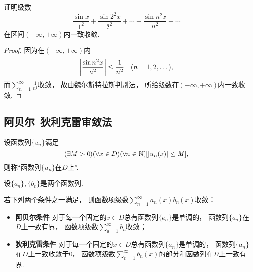 \begin{example}
证明级数\[
	\frac{\sin x}{1^2}
	+ \frac{\sin 2^2 x}{2^2}
	+ \dotsb
	+ \frac{\sin n^2 x}{n^2}
	+ \dotsb
\]在区间\((-\infty,+\infty)\)内一致收敛.
\begin{proof}
因为在\((-\infty,+\infty)\)内\[
	\abs{\frac{\sin n^2 x}{n^2}} \leq \frac{1}{n^2}
	\quad(n=1,2,\dotsc),
\]
而\(\sum_{n=1}^\infty \frac{1}{n^2}\)收敛，
故由\hyperref[theorem:无穷级数.魏尔斯特拉斯判别法]{魏尔斯特拉斯判别法}，
所给级数在\((-\infty,+\infty)\)内一致收敛.
\end{proof}
\end{example}

\subsection{阿贝尔--狄利克雷审敛法}
\begin{definition}
设函数列\(\{u_n\}\)满足\[
	(\exists M>0)
	(\forall x \in D)
	(\forall n\in\mathbb{N})
	[\abs{u_n(x)} \leq M],
\]
则称“函数列\(\{u_n\}\)在\(D\)上”.
\end{definition}

\begin{theorem}\label{theorem:函数项级数.函数项级数的阿贝尔--狄利克雷审敛法}
设\(\{a_n\},\{b_n\}\)是两个函数列.

若下列两个条件之一满足，
则函数项级数\(\sum_{n=1}^\infty a_n(x) b_n(x)\)收敛：\begin{itemize}
	\item {\bf 阿贝尔条件}
	对于每一个固定的\(x \in D\)总有函数列\(\{a_n\}\)是单调的，
	函数列\(\{a_n\}\)在\(D\)上一致有界，
	函数项级数\(\sum_{n=1}^\infty b_n\)收敛；

	\item {\bf 狄利克雷条件}
	对于每一个固定的\(x \in D\)总有函数列\(\{a_n\}\)是单调的，
	函数列\(\{a_n\}\)在\(D\)上一致收敛于\(0\)，
	函数项级数\(\sum_{n=1}^\infty b_n(x)\)的部分和函数列在\(D\)上一致有界.
\end{itemize}
\end{theorem}


